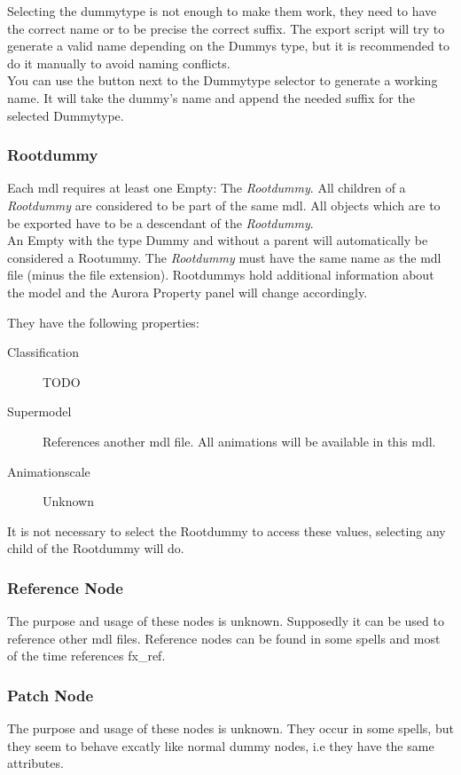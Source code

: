 Selecting the dummytype is not enough to make them work, they need to have
the correct name or to be precise the correct suffix.
The export script will try to generate a valid name depending on
the Dummys type, but it is recommended to do it manually to avoid naming
conflicts. \\

You can use the button next to the Dummytype selector to generate a
working name. It will take the dummy's name and append the needed suffix for
the selected Dummytype. \\

\subsubsection{Rootdummy}
Each mdl requires at least one Empty: The {\textit{Rootdummy}}. All children
of a {\textit{Rootdummy}} are considered to be part of the same mdl. All
objects which are to be exported have to be a descendant of
the {\textit{Rootdummy}}. \\

An Empty with the type Dummy and without a parent will automatically be
considered a Rootummy. The {\textit{Rootdummy}} must have the same name as the
mdl file (minus the file extension). Rootdummys hold additional
information about the model and the Aurora Property panel will
change accordingly.

They have the following properties:
\begin{description}
    \item[Classification] TODO
    \item[Supermodel] References another mdl file. All animations will be available in this mdl.
    \item[Animationscale] Unknown
\end{description}
It is not necessary to select the Rootdummy to access
these values, selecting any child of the Rootdummy will do.

\subsubsection{Reference Node}
The purpose and usage of these nodes is unknown. Supposedly it can be used to
reference other mdl files. Reference nodes can be found in some spells and
most of the time references fx\_ref.

\subsubsection{Patch Node}
The purpose and usage of these nodes is unknown. They occur in some spells, but
they seem to behave excatly like normal dummy nodes, i.e they have the same
attributes.

